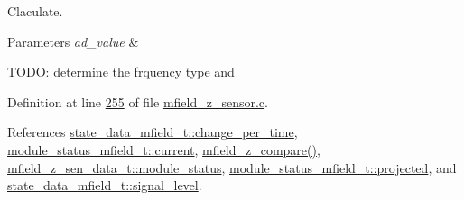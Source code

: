 Claculate. 


\begin{DoxyParams}{Parameters}
{\em ad\+\_\+value} & \\
\hline
\end{DoxyParams}
T\+O\+D\+O\+: determine the frquency type and 

Definition at line \hyperlink{a00053_source_l00255}{255} of file \hyperlink{a00053_source}{mfield\+\_\+z\+\_\+sensor.\+c}.



References \hyperlink{a00019_source_l00102}{state\+\_\+data\+\_\+mfield\+\_\+t\+::change\+\_\+per\+\_\+time}, \hyperlink{a00019_source_l00108}{module\+\_\+status\+\_\+mfield\+\_\+t\+::current}, \hyperlink{a00053_source_l00223}{mfield\+\_\+z\+\_\+compare()}, \hyperlink{a00027_source_l00047}{mfield\+\_\+z\+\_\+sen\+\_\+data\+\_\+t\+::module\+\_\+status}, \hyperlink{a00019_af2267fb093fb5dcaa006a570a6da3b6b}{module\+\_\+status\+\_\+mfield\+\_\+t\+::projected}, and \hyperlink{a00019_source_l00101}{state\+\_\+data\+\_\+mfield\+\_\+t\+::signal\+\_\+level}.


